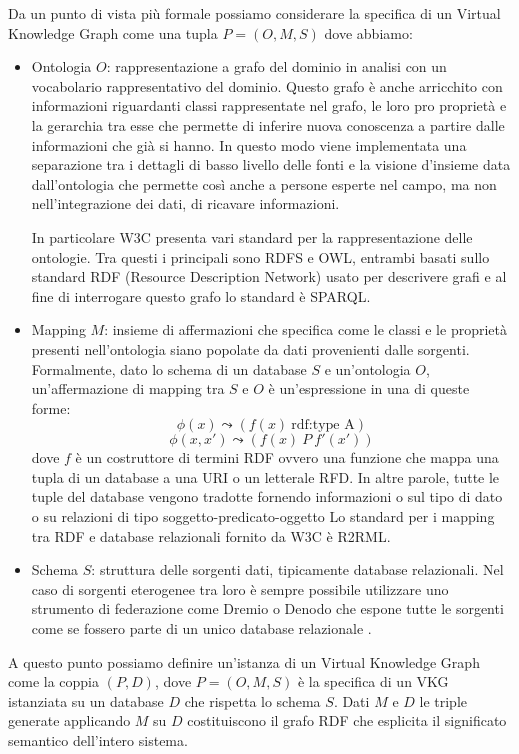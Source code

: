 Da un punto di vista più formale possiamo considerare la specifica di un Virtual Knowledge Graph come una tupla $P = (O, M, S)$ dove abbiamo:
\begin{itemize}
    \item Ontologia $O$: rappresentazione a grafo del dominio in analisi con un vocabolario rappresentativo del dominio. Questo grafo è anche arricchito con informazioni riguardanti classi rappresentate nel grafo, le loro pro
        proprietà e la gerarchia tra esse che permette di inferire nuova conoscenza a partire dalle informazioni che già si hanno.
        In questo modo viene implementata una separazione tra i dettagli di basso livello delle fonti e la visione d'insieme data dall'ontologia che permette così anche a persone esperte nel campo, ma non nell'integrazione 
        dei dati, di ricavare informazioni. 
        
        In particolare W3C presenta vari standard per la rappresentazione delle ontologie. Tra questi i principali sono RDFS e OWL, entrambi basati sullo standard RDF (Resource Description Network) usato per descrivere grafi e al 
        fine di interrogare questo grafo lo standard è SPARQL.
    \item Mapping $M$: insieme di affermazioni che specifica come le classi e le proprietà presenti nell'ontologia siano popolate da dati provenienti dalle sorgenti. Formalmente, dato lo schema di un database $S$ e 
        un'ontologia $O$, un'affermazione di mapping tra $S$ e $O$ è un'espressione in una di queste forme:
        \[ \phi(x) \leadsto (f(x) \ \textrm{rdf:type A}) \]
        \[\phi(x, x') \leadsto (f(x) \ P \ f'(x'))\] 
        dove $f$ è un costruttore di termini RDF ovvero una funzione che mappa una tupla di un database a una URI o un letterale RFD.
        In altre parole, tutte le tuple del database vengono tradotte fornendo informazioni o sul tipo di dato o su relazioni di tipo soggetto-predicato-oggetto
        Lo standard per i mapping tra RDF e database relazionali fornito da W3C è R2RML.
    \item Schema $S$: struttura delle sorgenti dati, tipicamente database relazionali. Nel caso di sorgenti eterogenee tra loro è sempre possibile utilizzare uno strumento di federazione come Dremio o Denodo che espone tutte
        le sorgenti come se fossero parte di un unico database relazionale \cite{VKGMedical}.
\end{itemize}

A questo punto possiamo definire un'istanza di un Virtual Knowledge Graph come la coppia $(P, D)$, dove $P = (O, M, S)$ è la specifica di un VKG istanziata su un database $D$ che rispetta lo schema $S$.
Dati $M$ e $D$ le triple generate applicando $M$ su $D$ costituiscono il grafo RDF che esplicita il significato semantico dell'intero sistema.

